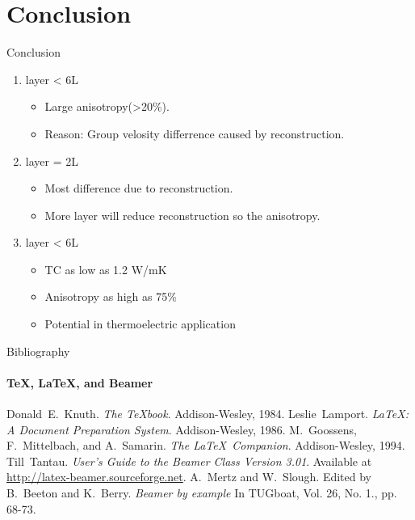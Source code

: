 \documentclass{beamer}
\begin{document}
\section{Conclusion}
\begin{frame}[label=lists]{Conclusion}

  \begin{enumerate}
    \item layer < 6L
          \begin{itemize}
            \item Large anisotropy(>20\%).
          \end{itemize}
          \begin{itemize}
            \item Reason: Group velosity differrence caused by reconstruction.
          \end{itemize}
    \item layer = 2L
          \begin{itemize}
            \item Most difference due to reconstruction.
          \end{itemize}
          \begin{itemize}
            \item More layer will reduce reconstruction so the anisotropy.
          \end{itemize}
    \item layer < 6L
          \begin{itemize}
            \item TC as low as 1.2 W/mK
          \end{itemize}
          \begin{itemize}
            \item Anisotropy as high as 75\%
          \end{itemize}

          \begin{itemize}
            \item Potential in thermoelectric application
          \end{itemize}
  \end{enumerate}
  \bigskip
  \justifying
\end{frame}


\begin{frame}[label=bibliography]{Bibliography}
  \framesubtitle{\TeX, \LaTeX, and Beamer}
  \begin{thebibliography}{9}
    Donald~E.~Knuth.
    \emph{The \TeX book}.
    Addison-Wesley, 1984.
    Leslie~Lamport.
    \emph{\LaTeX : A Document Preparation System}.
    Addison-Wesley, 1986.
    M.~Goossens, F.~Mittelbach, and A.~Samarin.
    \emph{The \LaTeX\ Companion}.
    Addison-Wesley, 1994.
    Till~Tantau.
    \emph{User's Guide to the Beamer Class Version 3.01}.
    Available at \url{http://latex-beamer.sourceforge.net}.
    A.~Mertz and W.~Slough.
    Edited by B.~Beeton and K.~Berry.
    \emph{Beamer by example} In TUGboat,
    Vol. 26, No. 1., pp. 68-73.
  \end{thebibliography}\end{frame}
\end{document}
